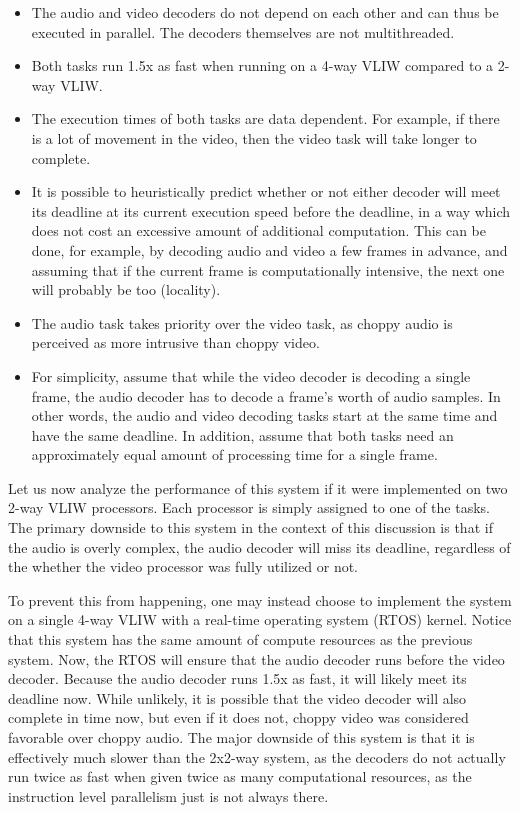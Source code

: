\begin{itemize}

\item The audio and video decoders do not depend on each other and can thus be
executed in parallel. The decoders themselves are not multithreaded.

\item Both tasks run 1.5x as fast when running on a 4-way VLIW compared to a
2-way VLIW. %

\item The execution times of both tasks are data dependent. For example, if
there is a lot of movement in the video, then the video task will take longer
to complete.

\item It is possible to heuristically predict whether or not either decoder
will meet its deadline at its current execution speed before the deadline, in
a way which does not cost an excessive amount of additional computation. This
can be done, for example, by decoding audio and video a few frames in advance,
and assuming that if the current frame is computationally intensive, the next
one will probably be too (locality).

\item The audio task takes priority over the video task, as choppy audio is 
perceived as more intrusive than choppy video.

\item For simplicity, assume that while the video decoder is decoding a single
frame, the audio decoder has to decode a frame's worth of audio samples. In
other words, the audio and video decoding tasks start at the same time and have
the same deadline. In addition, assume that both tasks need an approximately
equal amount of processing time for a single frame.

\end{itemize}

\noindent Let us now analyze the performance of this system if it were 
implemented on two 2-way VLIW processors. Each processor is simply assigned to 
one of the tasks. The primary downside to this system in the context of this 
discussion is that if the audio is overly complex, the audio decoder will miss 
its deadline, regardless of the whether the video processor was fully utilized 
or not.

To prevent this from happening, one may instead choose to implement the system
on a single 4-way VLIW with a real-time operating system (RTOS) kernel. Notice
that this system has the same amount of compute resources as the previous
system. Now, the RTOS will ensure that the audio decoder runs before the video
decoder. Because the audio decoder runs 1.5x as fast, it will likely meet its
deadline now. While unlikely, it is possible that the video decoder will also
complete in time now, but even if it does not, choppy video was considered
favorable over choppy audio. The major downside of this system is that it is
effectively much slower than the 2x2-way system, as the decoders do not
actually run twice as fast when given twice as many computational resources,
as the instruction level parallelism just is not always there.

